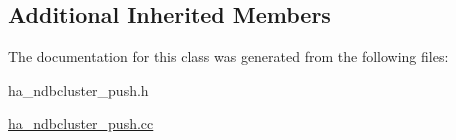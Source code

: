 \subsection*{Additional Inherited Members}


The documentation for this class was generated from the following files\+:\begin{DoxyCompactItemize}
\item 
ha\+\_\+ndbcluster\+\_\+push.\+h\item 
\mbox{\hyperlink{ha__ndbcluster__push_8cc}{ha\+\_\+ndbcluster\+\_\+push.\+cc}}\end{DoxyCompactItemize}
